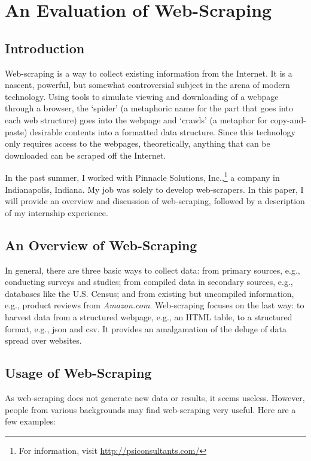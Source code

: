 \documentclass[12pt]{report}
\begin{document}
\tableofcontents
\listoffigures

\chapter{An Evaluation of Web-Scraping}
\section*{Introduction}
Web-scraping is a way to collect existing information from the Internet. It is a nascent, powerful, but somewhat controversial subject in the arena of modern technology. Using tools to simulate viewing and downloading of a webpage through a browser, the `spider' (a metaphoric name for the part that goes into each web structure) goes into the webpage and `crawls' (a metaphor for copy-and-paste) desirable contents into a formatted data structure. Since this technology only requires access to the webpages, theoretically, anything that can be downloaded can be scraped off the Internet.

In the past summer, I worked with Pinnacle Solutions, Inc.,\footnote{For information, visit \url{http://psiconsultants.com/}} a company in Indianapolis, Indiana. My job was solely to develop web-scrapers. In this paper, I will provide an overview and discussion of web-scraping, followed by a description of my internship experience.

\section{An Overview of Web-Scraping}
In general, there are three basic ways to collect data: from primary sources, e.g., conducting surveys and studies; from compiled data in secondary sources, e.g., databases like the U.S. Census; and from existing but uncompiled information, e.g., product reviews from \textit{Amazon.com}. Web-scraping focuses on the last way: to \gls{harvest} data from a structured webpage, e.g., an HTML table, to a structured format, e.g., \gls{json} and \gls{csv}. It provides an amalgamation of the deluge of data spread over websites.

\section{Usage of Web-Scraping}
As web-scraping does not generate new data or results, it seems useless. However, people from various backgrounds may find web-scraping very useful. Here are a few examples:
\end{document}
